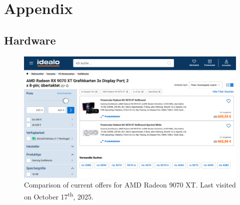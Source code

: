 \clearpage
\section{Appendix}
\label{sec:anhang}

\subsection{Hardware}

\begin{figure}[h]
    \centering
    \includegraphics[width=\textwidth]{graphs/gpu.png}
    \caption{Comparison of current offers for AMD Radeon 9070 XT. Last visited on October 17\textsuperscript{th}, 2025.}
\end{figure}






